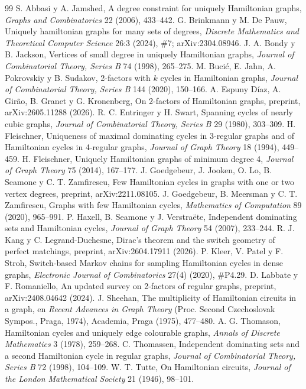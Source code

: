 \documentclass[11pt,a4paper]{article}
\theoremstyle{definition}
\theoremstyle{remark}
\begin{document}
\begin{thebibliography}{99}
 S. Abbasi y A. Jamshed, A degree constraint for uniquely Hamiltonian graphs, \emph{Graphs and Combinatorics} 22 (2006), 433--442.
 G. Brinkmann y M. De Pauw, Uniquely hamiltonian graphs for many sets of degrees, \emph{Discrete Mathematics and Theoretical Computer Science} 26:3 (2024), \#7; arXiv:2304.08946.
 J. A. Bondy y B. Jackson, Vertices of small degree in uniquely Hamiltonian graphs, \emph{Journal of Combinatorial Theory, Series B} 74 (1998), 265--275.
 M. Bucić, E. Jahn, A. Pokrovskiy y B. Sudakov, 2-factors with $k$ cycles in Hamiltonian graphs, \emph{Journal of Combinatorial Theory, Series B} 144 (2020), 150--166.
 A. Espuny Díaz, A. Girão, B. Granet y G. Kronenberg, On 2-factors of Hamiltonian graphs, preprint, arXiv:2605.11288 (2026).
 R. C. Entringer y H. Swart, Spanning cycles of nearly cubic graphs, \emph{Journal of Combinatorial Theory, Series B} 29 (1980), 303--309.
 H. Fleischner, Uniqueness of maximal dominating cycles in 3-regular graphs and of Hamiltonian cycles in 4-regular graphs, \emph{Journal of Graph Theory} 18 (1994), 449--459.
 H. Fleischner, Uniquely Hamiltonian graphs of minimum degree 4, \emph{Journal of Graph Theory} 75 (2014), 167--177.
 J. Goedgebeur, J. Jooken, O. Lo, B. Seamone y C. T. Zamfirescu, Few Hamiltonian cycles in graphs with one or two vertex degrees, preprint, arXiv:2211.08105.
 J. Goedgebeur, B. Meersman y C. T. Zamfirescu, Graphs with few Hamiltonian cycles, \emph{Mathematics of Computation} 89 (2020), 965--991.
 P. Haxell, B. Seamone y J. Verstraëte, Independent dominating sets and Hamiltonian cycles, \emph{Journal of Graph Theory} 54 (2007), 233--244.
 R. J. Kang y C. Legrand-Duchesne, Dirac's theorem and the switch geometry of perfect matchings, preprint, arXiv:2604.17911 (2026).
 P. Kleer, V. Patel y F. Stroh, Switch-based Markov chains for sampling Hamiltonian cycles in dense graphs, \emph{Electronic Journal of Combinatorics} 27(4) (2020), \#P4.29.
 D. Labbate y F. Romaniello, An updated survey on 2-factors of regular graphs, preprint, arXiv:2408.04642 (2024).
 J. Sheehan, The multiplicity of Hamiltonian circuits in a graph, en \emph{Recent Advances in Graph Theory} (Proc. Second Czechoslovak Sympos., Praga, 1974), Academia, Praga (1975), 477--480.
 A. G. Thomason, Hamiltonian cycles and uniquely edge colourable graphs, \emph{Annals of Discrete Mathematics} 3 (1978), 259--268.
 C. Thomassen, Independent dominating sets and a second Hamiltonian cycle in regular graphs, \emph{Journal of Combinatorial Theory, Series B} 72 (1998), 104--109.
 W. T. Tutte, On Hamiltonian circuits, \emph{Journal of the London Mathematical Society} 21 (1946), 98--101.
\end{thebibliography}
\end{document}
